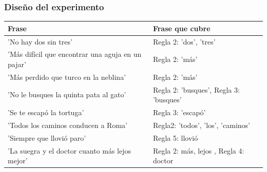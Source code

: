 \documentclass[mathserif]{beamer}%
\begin{document}
\begin{frame}
	\frametitle{Diseño del experimento}
	\scriptsize
	\begin{longtable}{| p{} || p{} |} 
		\hline
		\textbf{Frase} & \textbf{Frase que cubre} \\ \hline	
		
		'No hay dos sin tres' & Regla 2: 'dos', 'tres'\\ \hline
		'Más difícil que encontrar una aguja en un pajar' & Regla 2: 'más' \\ \hline
		'Más perdido que turco en la neblina' & Regla 2: 'más' \\ \hline
		'No le busques la quinta pata al gato' & Regla 2: 'busques', Regla 3: 'busques'   \\ \hline
		'Se te escapó la tortuga' & Regla 3: 'escapó'   \\ \hline
		'Todos los caminos conducen a Roma' & Regla2: 'todos', 'los', 'caminos' \\ \hline
		'Siempre que llovió paro' & Regla 5: llovió  \\ \hline
		'La suegra y el doctor cuanto más lejos mejor' & Regla 2: más, lejos , Regla 4: doctor \\ \hline

\end{longtable}
\end{frame}
\end{document}
